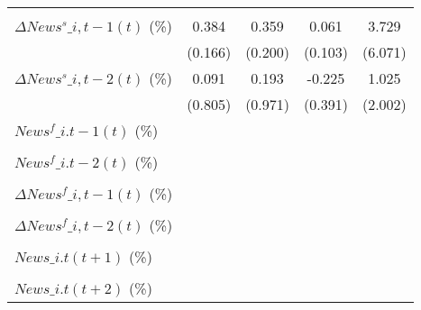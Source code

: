 {\begin{tabular}{l*{4}{c}}
                    &                     &                     &                     &                     \\
\addlinespace
$ \Delta News^s\_{i,t-1}(t)$ (\%)&       0.384\sym{**} &       0.359\sym{*}  &       0.061         &       3.729         \\
                    &     (0.166)         &     (0.200)         &     (0.103)         &     (6.071)         \\
\addlinespace
$ \Delta News^s\_{i,t-2}(t)$ (\%)&       0.091         &       0.193         &      -0.225         &       1.025         \\
                    &     (0.805)         &     (0.971)         &     (0.391)         &     (2.002)         \\
\addlinespace
$ News^f\_{i.t-1}(t)$ (\%)&                     &                     &                     &                     \\
                    &                     &                     &                     &                     \\
\addlinespace
$ News^f\_{i.t-2}(t)$ (\%)&                     &                     &                     &                     \\
                    &                     &                     &                     &                     \\
\addlinespace
$ \Delta News^f\_{i,t-1}(t)$ (\%)&                     &                     &                     &                     \\
                    &                     &                     &                     &                     \\
\addlinespace
$ \Delta News^f\_{i,t-2}(t)$ (\%)&                     &                     &                     &                     \\
                    &                     &                     &                     &                     \\
\addlinespace
$ News\_{i.t}(t+1)$ (\%)&                     &                     &                     &                     \\
                    &                     &                     &                     &                     \\
\addlinespace
$ News\_{i.t}(t+2)$ (\%)&                     &                     &                     &                     \\

\end{tabular}}
